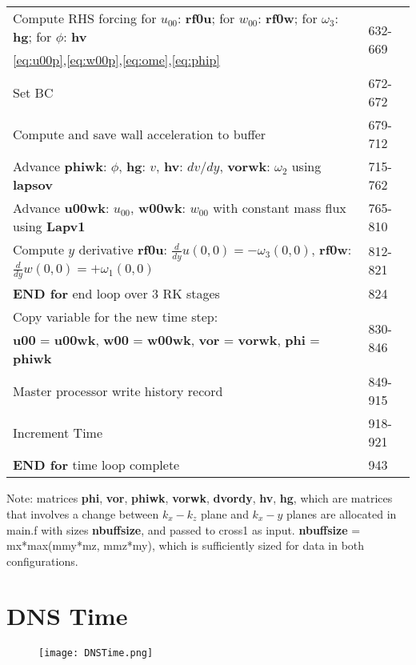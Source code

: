 \documentclass[titlepage,12pt,letter]{article}
\numberwithin{equation}{section}
\begin{document}
\begin{table}[H]
	\centering 
	\renewcommand{\arraystretch}{1.5} 
	\begin{tabular}{l|l}
		\qquad \qquad Compute RHS forcing for $u_{00}$: \textbf{rf0u}; for $w_{00}$: \textbf{rf0w}; for $\omega_3$: \textbf{hg}; for $\phi$: \textbf{hv}&\multirow{2}{*}{632-669}\\ 
		\qquad \qquad \eqref{eq:u00p},\eqref{eq:w00p},\eqref{eq:ome},\eqref{eq:phip}&\\
		\qquad \qquad Set BC&672-672\\
		\qquad \qquad Compute and save wall acceleration to buffer&679-712\\
		\qquad \qquad Advance \textbf{phiwk}: $\phi$, \textbf{hg}: $v$, \textbf{hv}: $dv/dy$, \textbf{vorwk}: $\omega_2$ using \textbf{lapsov}&715-762\\
		\qquad \qquad Advance \textbf{u00wk}: $u_{00}$, \textbf{w00wk}: $w_{00}$ with constant mass flux using \textbf{Lapv1}&765-810\\
		\qquad \qquad Compute $y$ derivative \textbf{rf0u}: ${\tfrac{d}{dy} u(0,0) = - \omega_3(0,0)}$, \textbf{rf0w}: ${\tfrac{d}{dy} w(0,0) = + \omega_1(0,0)}$&812-821\\
		\qquad \textbf{END for} end loop over 3 RK stages&824\\ \hdashline
		
		\qquad Copy variable for the new time step:& \multirow{2}{*}{830-846}\\
		\qquad \textbf{u00} = \textbf{u00wk}, \textbf{w00} = \textbf{w00wk}, \textbf{vor} = \textbf{vorwk}, \textbf{phi} = \textbf{phiwk}&\\
		\qquad Master processor write history record& 849-915\\
		\qquad Increment Time&918-921\\
		\textbf{END for} time loop complete&943\\ \hline
	\end{tabular} 
\end{table}


Note: matrices \textbf{phi}, \textbf{vor}, \textbf{phiwk}, \textbf{vorwk}, \textbf{dvordy}, \textbf{hv}, \textbf{hg}, which are matrices that involves a change between $k_x-k_z$ plane and $k_x-y$ planes are allocated in main.f with sizes \textbf{nbuffsize}, and passed to cross1 as input. \textbf{nbuffsize} = mx*max(mmy*mz, mmz*my), which is sufficiently sized for data in both configurations.


\section{DNS Time}
\begin{figure}[H]
	\centering
	\texttt{[image: DNSTime.png]}
\end{figure}
\end{document}
